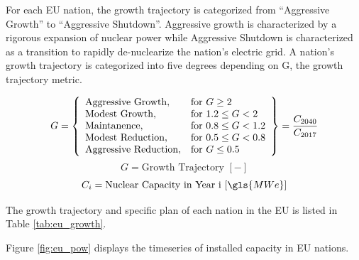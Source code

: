 For each \gls{EU} nation, the growth trajectory is categorized from
``Aggressive Growth'' to ``Aggressive Shutdown''. Aggressive growth is
characterized by a rigorous expansion of nuclear power while
Aggressive Shutdown is characterized as a transition to rapidly
de-nuclearize the nation's electric grid. A nation's growth trajectory is
categorized into five degrees depending on G, the growth trajectory metric.

 \[
 G = \left\{\begin{array}{ll}
 \text{Aggressive Growth}, & \text{for } G \geq 2\\
 \text{Modest Growth}, & \text{for } 1.2 \leq G < 2\\
 \text{Maintanence}, & \text{for } 0.8 \leq G < 1.2 \\
 \text{Modest Reduction}, & \text{for } 0.5 \leq G< 0.8\\
 \text{Aggressive Reduction}, & \text{for } G \leq 0.5
 \end{array}\right\} = \frac{C_{2040}}{C_{2017}}\\\\
 \]
 \[
  G = \text{Growth Trajectory  } [-] 
 \]
 \[
 C_{i} = \text{Nuclear Capacity in Year i  } [\gls{MWe}]
 \]

The growth trajectory and specific plan of each nation in the \gls{EU} 
is listed in Table \ref{tab:eu_growth}.


Figure \ref{fig:eu_pow} displays the
timeseries of installed capacity in \gls{EU} nations.


